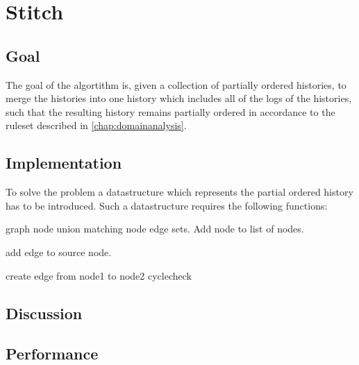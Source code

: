 \section{Stitch}
\subsection{Goal} %
The goal of the algortithm is, given a collection of partially ordered histories, to merge the histories into one history which includes all of the logs of the histories, such that the resulting history remains partially ordered in accordance to the ruleset described in \ref{chap:domainanalysis}.


\subsection{Implementation} %
To solve the problem a datastructure which represents the partial ordered history has to be introduced. Such a datastructure requires the following functions:

\begin{algorithmic}
 {graph node}
	    \State union matching node edge sets.
	\Else
	    \State Add node to list of nodes.
	\EndIf
\EndFunction

\State\State

	\State add edge to source node.
\EndFunction

\State\State

		\State{}
	\EndFor
\EndFor
{}
				\State create edge from node1 to node2
			\EndIf
		\EndIf
	\EndFor
\EndFor
\State cyclecheck
\EndFunction
\end{algorithmic}

\subsection{Discussion} %
\subsection{Performance} %

